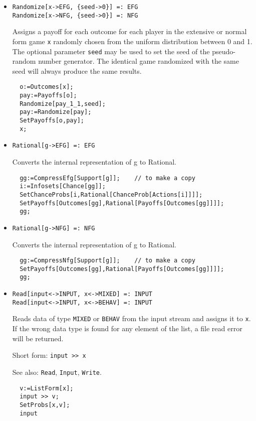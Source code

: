 \begin{itemize}

\item{}
\protect \large \begin{verbatim}
Randomize[x->EFG, {seed->0}] =: EFG 
Randomize[x->NFG, {seed->0}] =: NFG 
\end{verbatim}\normalsize

\bd 
Assigns a payoff for each outcome for each player in the extensive
or normal form game \verb+x+ randomly chosen from the uniform
distribution between 0 and 1.  The optional parameter \verb+seed+ may
be used to set the seed of the pseudo-random number generator.  The
identical game randomized with the same seed will always produce the
same results.
\begin{verbatim}
  o:=Outcomes[x];
  pay:=Payoffs[o];
  Randomize[pay_1_1,seed];
  pay:=Randomize[pay];
  SetPayoffs[o,pay];
  x;
\end{verbatim} 
\ed

\item{}
\protect \large \begin{verbatim}
Rational[g->EFG] =: EFG 
\end{verbatim}\normalsize

\bd 
Converts the internal representation of g to Rational.  
\begin{verbatim}
  gg:=CompressEfg[Support[g]];    // to make a copy
  i:=Infosets[Chance[gg]];
  SetChanceProbs[i,Rational[ChanceProb[Actions[i]]]];
  SetPayoffs[Outcomes[gg],Rational[Payoffs[Outcomes[gg]]]];
  gg;
\end{verbatim} 
\ed

\item{}
\protect \large \begin{verbatim}
Rational[g->NFG] =: NFG 
\end{verbatim}\normalsize

\bd 
Converts the internal representation of g to Rational.  
\begin{verbatim}
  gg:=CompressNfg[Support[g]];    // to make a copy
  SetPayoffs[Outcomes[gg],Rational[Payoffs[Outcomes[gg]]]];
  gg;
\end{verbatim} 
\ed

\item{}
\protect \large \begin{verbatim}
Read[input<->INPUT, x<->MIXED] =: INPUT 
Read[input<->INPUT, x<->BEHAV] =: INPUT 
\end{verbatim}\normalsize

\bd 
Reads data of type \verb+MIXED+ or \verb+BEHAV+ from the input
stream and assigns it to \verb+x+.  If the wrong data type is found
for any element of the list, a file read error will be returned.
\item [Short form:] \verb+input >> x+
\item [See also:] \verb+Read+, \verb+Input+, \verb+Write+.
\begin{verbatim}
  v:=ListForm[x];
  input >> v;
  SetProbs[x,v];
  input
\end{verbatim} 
\ed


\end{itemize}

